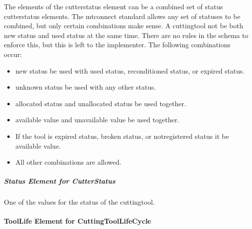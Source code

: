 \FloatBarrier

The elements of the \gls{cutterstatus} element can be a combined set of \gls{status cutterstatus} elements.  The \gls{mtconnect standard} allows any set of statuses to be combined, but only certain combinations make sense.  A \gls{cuttingtool} \SHOULD not be both \gls{new status} and \gls{used status} at the same time.  There are no rules in the schema to enforce this, but this is left to the implementer.  The following combinations \MUSTNOT occur: 

\begin{itemize}
    \item \gls{new status} \MUSTNOT be used with \gls{used status}, \gls{reconditioned status}, or \gls{expired status}.
    \item \gls{unknown status} \MUSTNOT be used with any other status. 
    \item \gls{allocated status} and \gls{unallocated status} \MUSTNOT be used together.
    \item \gls{available value} and \gls{unavailable value} \MUSTNOT be used together.
    \item If the tool is \gls{expired status}, \gls{broken status}, or \gls{notregistered status} it \MUSTNOT be \gls{available value}.
    \item All other combinations are allowed.
\end{itemize}



\subparagraph{Status Element for CutterStatus} \mbox{}

One of the values for the status of the \gls{cuttingtool}.



\pagebreak

\paragraph{ToolLife Element for CuttingToolLifeCycle}\mbox{}

